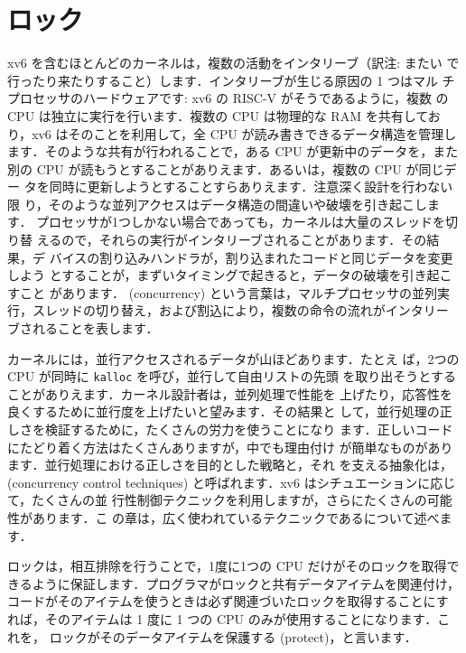 \chapter{ロック}
\label{CH:LOCK}

xv6 を含むほとんどのカーネルは，複数の活動をインタリーブ（訳注: またい
で行ったり来たりすること）します．インタリーブが生じる原因の 1 つはマル
チプロセッサのハードウェアです: xv6 の RISC-V がそうであるように，複数
の CPU は独立に実行を行います．複数の CPU は物理的な RAM を共有してお
り，xv6 はそのことを利用して，全 CPU が読み書きできるデータ構造を管理し
ます．そのような共有が行われることで，ある CPU が更新中のデータを，また
別の CPU が読もうとすることがありえます．あるいは，複数の CPU が同じデー
タを同時に更新しようとすることすらありえます．注意深く設計を行わない限
り，そのような並列アクセスはデータ構造の間違いや破壊を引き起こします．
プロセッサが1つしかない場合であっても，カーネルは大量のスレッドを切り替
えるので，それらの実行がインタリーブされることがあります．その結果，デ
バイスの割り込みハンドラが，割り込まれたコードと同じデータを変更しよう
とすることが，まずいタイミングで起きると，データの破壊を引き起こすこと
があります． (concurrency) という言葉は，マルチプロセッサの並列実
行，スレッドの切り替え，および割込により，複数の命令の流れがインタリー
ブされることを表します．

カーネルには，並行アクセスされるデータが山ほどあります．たとえ
ば，2つのCPU が同時に \texttt{kalloc} を呼び，並行して自由リストの先頭
を取り出そうとすることがありえます．カーネル設計者は，並列処理で性能を
上げたり，応答性を良くするために並行度を上げたいと望みます．その結果と
して，並行処理の正しさを検証するために，たくさんの労力を使うことになり
ます．正しいコードにたどり着く方法はたくさんありますが，中でも理由付け
が簡単なものがあります．並行処理における正しさを目的とした戦略と，それ
を支える抽象化は， (concurrency control
techniques) と呼ばれます．xv6 はシチュエーションに応じて，たくさんの並
行性制御テクニックを利用しますが，さらにたくさんの可能性があります．こ
の章は，広く使われているテクニックであるについて述べます．

ロックは，相互排除を行うことで，1度に1つの CPU だけがそのロックを取得で
きるように保証します．プログラマがロックと共有データアイテムを関連付け，
コードがそのアイテムを使うときは必ず関連づいたロックを取得することにす
れば，そのアイテムは 1 度に 1 つの CPU のみが使用することになります．これを，
ロックがそのデータアイテムを保護する (protect)，と言います．

